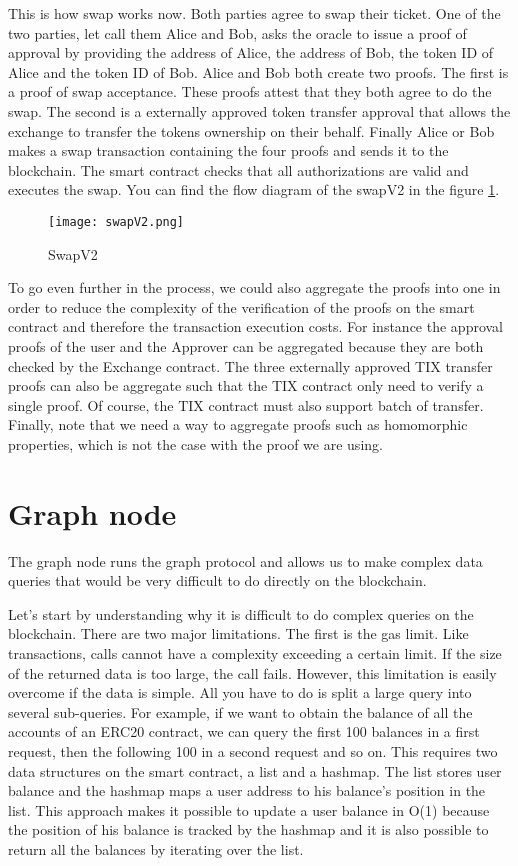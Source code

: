 \documentclass[a4paper,11pt,oneside]{report}
\begin{document}
This is how swap works now. Both parties agree to swap their ticket. One of the two parties, let call them Alice and Bob, asks the oracle to issue a proof of approval by providing the address of Alice, the address of Bob, the token ID of Alice and the token ID of Bob. Alice and Bob both create two proofs. The first is a proof of swap acceptance. These proofs attest that they both agree to do the swap. The second is a externally approved token transfer approval that allows the exchange to transfer the tokens ownership on their behalf. Finally Alice or Bob makes a swap transaction containing the four proofs and sends it to the blockchain. The smart contract checks that all authorizations are valid and executes the swap. You can find the flow diagram of the swapV2 in the figure \hyperref[fig:swapV2]{ \ref{fig:swapV2}}.

\begin{figure}[h!] 
  \centering
  \texttt{[image: swapV2.png]}
  \caption{SwapV2}
  \label{fig:swapV2}
\end{figure}

To go even further in the process, we could also aggregate the proofs into one in order to reduce the complexity of the verification of the proofs on the smart contract and therefore the transaction execution costs. For instance the approval proofs of the user and the Approver can be aggregated because they are both checked by the Exchange contract. The three externally approved TIX transfer proofs can also be aggregate such that the TIX contract only need to verify a single proof. Of course, the TIX contract must also support batch of transfer. Finally, note that we need a way to aggregate proofs such as homomorphic properties, which is not the case with the proof we are using.

\section{Graph node}
The graph node runs the graph protocol and allows us to make complex data queries that would be very difficult to do directly on the blockchain.

Let's start by understanding why it is difficult to do complex queries on the blockchain. There are two major limitations. The first is the gas limit. Like transactions, calls cannot have a complexity exceeding a certain limit. If the size of the returned data is too large, the call fails. However, this limitation is easily overcome if the data is simple. All you have to do is split a large query into several sub-queries. For example, if we want to obtain the balance of all the accounts of an ERC20 contract, we can query the first 100 balances in a first request, then the following 100 in a second request and so on. This requires two data structures on the smart contract, a list and a hashmap. The list stores user balance and the hashmap maps a user address to his balance's position in the list. This approach makes it possible to update a user balance in O(1) because the position of his balance is tracked by the hashmap and it is also possible to return all the balances by iterating over the list.
\end{document}
